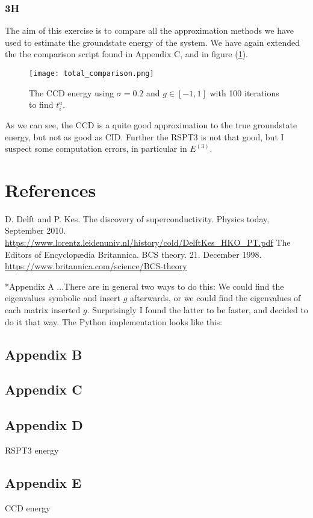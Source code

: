 \documentclass[norsk,a4paper,12pt]{article}
\begin{document}
\subsubsection*{3H}
The aim of this exercise is to compare all the approximation methods we have used to estimate the groundstate energy of the system. We have again extended the the comparison script found in Appendix C, and in figure (\ref{fig:total_comparison}).
\begin{figure}[H]
\centering
\texttt{[image: total\_comparison.png]}
\caption{The CCD energy using $\sigma=0.2$ and $g\in[-1,1]$ with 100 iterations to find $t_i^a$. \label{fig:total_comparison}}
\end{figure}
As we can see, the CCD is a quite good approximation to the true groundstate energy, but not as good as CID. Further the RSPT3 is not that good, but I suspect some computation errors, in particular in $E^{(3)}$.

\section{References}
\begingroup
\renewcommand{\section}[2]{}
\begin{thebibliography}{}
  D. Delft and P. Kes. 
  The discovery of superconductivity. 
  Physics today, September 2010. 
  \url{https://www.lorentz.leidenuniv.nl/history/cold/DelftKes_HKO_PT.pdf}
  The Editors of Encyclopædia Britannica. 
  BCS theory. 
  21. December 1998. 
  \url{https://www.britannica.com/science/BCS-theory}
\end{thebibliography}
\endgroup

\section{Appendices}
\subsection*{Appendix A}
...There are in general two ways to do this: We could find the eigenvalues symbolic and insert $g$ afterwards, or we could find the eigenvalues of each matrix inserted $g$. Surprisingly I found the latter to be faster, and decided to do it that way. The Python implementation looks like this:


\subsection*{Appendix B}


\subsection*{Appendix C}


\subsection*{Appendix D}
RSPT3 energy


\subsection*{Appendix E}
CCD energy

\end{document}
